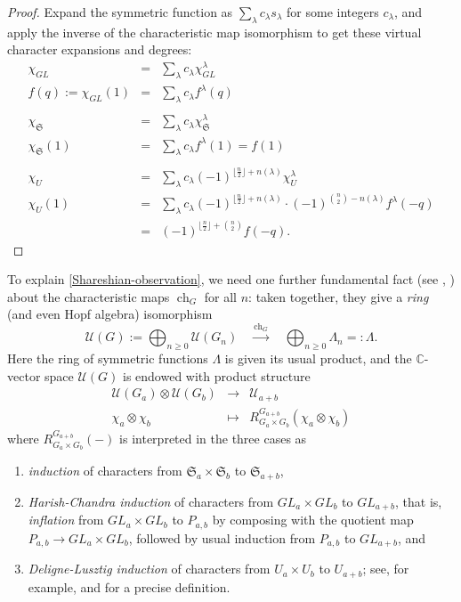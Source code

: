 \documentclass[10pt]{amsart}
\theoremstyle{plain}
\theoremstyle{definition}
\theoremstyle{remark}
\numberwithin{equation}{section}
\newcommand\ch{\operatorname{ch}}
\newcommand\CC{\mathbb{C}}
\newcommand\UUU{\mathcal{U}}
\newcommand\symm{\mathfrak{S}}
\begin{document}
\begin{proof}
Expand the symmetric function as $\sum_\lambda c_\lambda s_\lambda$
for some integers $c_\lambda$, and apply the inverse of the
characteristic map isomorphism to get these virtual character
expansions and degrees:
$$
\begin{array}{rcl}
\chi_{GL}&=& \sum_\lambda c_\lambda \chi_{GL}^\lambda \\
f(q):=\chi_{GL}(1)&=& \sum_\lambda c_\lambda f^\lambda(q)\\
 & & \\
\chi_\symm&=& \sum_\lambda c_\lambda \chi_\symm^\lambda \\
\chi_\symm(1)&=& \sum_\lambda c_\lambda f^\lambda(1) = f(1)\\
 & & \\
\chi_U&=& \sum_\lambda c_\lambda (-1)^{\lfloor \frac{n}{2}\rfloor+n(\lambda)}\chi_U^\lambda \\
\chi_U(1)&=&\sum_\lambda c_\lambda 
   (-1)^{\lfloor \frac{n}{2}\rfloor+n(\lambda)} \cdot
    (-1)^{\binom{n}{2}-n(\lambda)} f^\lambda(-q)\\
&=& (-1)^{\lfloor \frac{n}{2}\rfloor+\binom{n}{2}} f(-q).
\end{array}
$$
\end{proof}
To explain \eqref{Shareshian-observation},
we need one further fundamental fact 
(see \cite[Chap. I (7.3), Chap. IV (4.1)]{Macdonald}, \cite[Cor. 4.1]{ThiemVinroot})
about the characteristic maps $\ch_G$ for all $n$:
taken together, they give a {\it ring} (and even Hopf algebra) isomorphism 
$$
\UUU(G):=\bigoplus_{n \geq 0} \UUU(G_n) 
\quad \overset{\ch_G}{\longrightarrow} \quad
\bigoplus_{n \geq 0}\Lambda_n=:\Lambda.
$$
Here the ring of symmetric functions $\Lambda$
is given its usual product,
and the $\CC$-vector space $\UUU(G)$ is endowed with product
structure 
$$
\begin{array}{rcl}
\UUU(G_a) \otimes \UUU(G_b) & \longrightarrow & \UUU_{a+b} \\
\chi_a \otimes \chi_b &\longmapsto 
    & R^{G_{a+b}}_{G_a \times G_b} \left( \chi_a \otimes \chi_b \right)
\end{array}
$$
where $R^{G_{a+b}}_{G_a \times G_b}(-)$ is interpreted in the three cases as 
\begin{enumerate}
\item[$\bullet$]
{\it induction} of characters from $\symm_a \times \symm_b$
to $\symm_{a+b}$,
\item[$\bullet$]
{\it Harish-Chandra induction} of characters 
from $GL_a \times GL_b$ to $GL_{a+b}$, that is,
{\it inflation} from $GL_a \times GL_b$ to $P_{a,b}$ by
composing with the quotient map $P_{a,b} \rightarrow GL_a \times GL_b$,
followed by usual induction from $P_{a,b}$ to $GL_{a+b}$, and
\item[$\bullet$]
{\it Deligne-Lusztig induction} of characters 
from $U_a \times U_b$ to $U_{a+b}$; see, for example, \cite[Chapter 11]{DigneMichel} 
and \cite[Chapter 7]{Carter} for a precise definition.
\end{enumerate}
\end{document}
